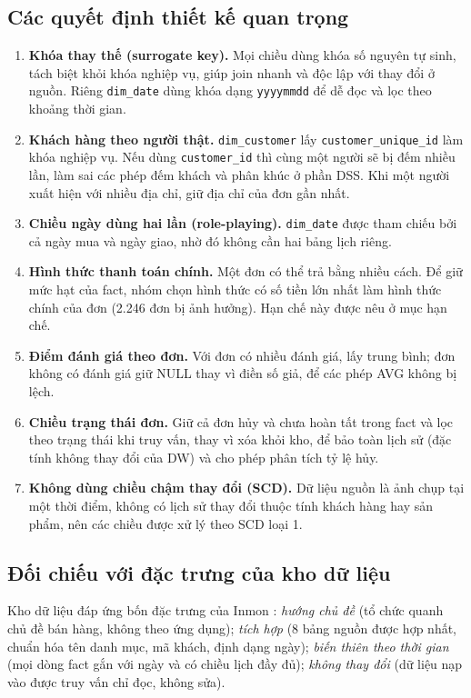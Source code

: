 \documentclass[12pt,a4paper]{article}
\newcommand{\code}[1]{\texttt{\small #1}}
\begin{document}
\subsection{Các quyết định thiết kế quan trọng}
\begin{enumerate}[label=\textbf{D\arabic*.}, leftmargin=*]
  \item \textbf{Khóa thay thế (surrogate key).} Mọi chiều dùng khóa số nguyên tự sinh, tách biệt khỏi khóa nghiệp vụ,
        giúp join nhanh và độc lập với thay đổi ở nguồn. Riêng \code{dim\_date} dùng khóa dạng \code{yyyymmdd}
        để dễ đọc và lọc theo khoảng thời gian.
  \item \textbf{Khách hàng theo người thật.} \code{dim\_customer} lấy \code{customer\_unique\_id} làm khóa nghiệp vụ.
        Nếu dùng \code{customer\_id} thì cùng một người sẽ bị đếm nhiều lần, làm sai các phép đếm khách và phân khúc
        ở phần DSS. Khi một người xuất hiện với nhiều địa chỉ, giữ địa chỉ của đơn gần nhất.
  \item \textbf{Chiều ngày dùng hai lần (role-playing).} \code{dim\_date} được tham chiếu bởi cả ngày mua và
        ngày giao, nhờ đó không cần hai bảng lịch riêng.
  \item \textbf{Hình thức thanh toán chính.} Một đơn có thể trả bằng nhiều cách. Để giữ mức hạt của fact, nhóm chọn
        hình thức có số tiền lớn nhất làm hình thức chính của đơn (2.246 đơn bị ảnh hưởng). Hạn chế này được nêu ở
        mục hạn chế.
  \item \textbf{Điểm đánh giá theo đơn.} Với đơn có nhiều đánh giá, lấy trung bình; đơn không có đánh giá giữ NULL
        thay vì điền số giả, để các phép AVG không bị lệch.
  \item \textbf{Chiều trạng thái đơn.} Giữ cả đơn hủy và chưa hoàn tất trong fact và lọc theo trạng thái khi truy vấn,
        thay vì xóa khỏi kho, để bảo toàn lịch sử (đặc tính không thay đổi của DW) và cho phép phân tích tỷ lệ hủy.
  \item \textbf{Không dùng chiều chậm thay đổi (SCD).} Dữ liệu nguồn là ảnh chụp tại một thời điểm, không có lịch sử
        thay đổi thuộc tính khách hàng hay sản phẩm, nên các chiều được xử lý theo SCD loại 1.
\end{enumerate}

\subsection{Đối chiếu với đặc trưng của kho dữ liệu}
Kho dữ liệu đáp ứng bốn đặc trưng của Inmon \cite{inmon2005}: \emph{hướng chủ đề} (tổ chức quanh chủ đề bán hàng,
không theo ứng dụng); \emph{tích hợp} (8 bảng nguồn được hợp nhất, chuẩn hóa tên danh mục, mã khách, định dạng ngày);
\emph{biến thiên theo thời gian} (mọi dòng fact gắn với ngày và có chiều lịch đầy đủ); \emph{không thay đổi}
(dữ liệu nạp vào được truy vấn chỉ đọc, không sửa).
\end{document}
